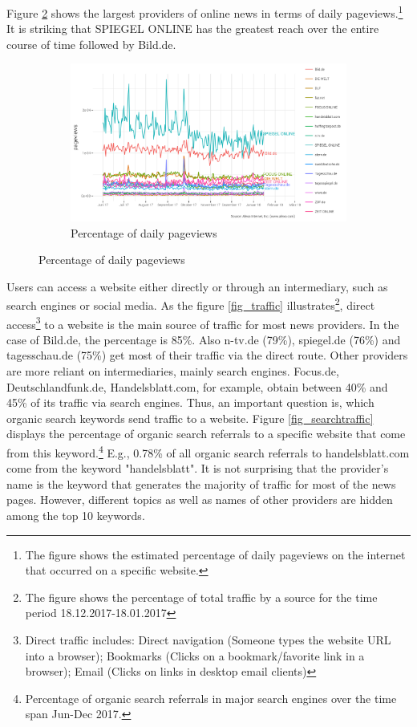 \documentclass[12pt,a4paper,notitlepage]{article}
\begin{document}
Figure \ref{fig_reach} shows the largest providers of online news in terms of daily pageviews.\footnote{The figure shows the estimated percentage of daily pageviews on the internet that occurred on a specific website.} It is striking that SPIEGEL ONLINE has the greatest reach over the entire course of time followed by Bild.de.

\begin{figure}[H]
	\caption{}
	\begin{center}
		\begin{subfigure}[normla]{0.8\textwidth}
			\includegraphics[width=\textwidth]{../figs/reach.png}
			\caption{Percentage of daily pageviews}
			\label{fig_reach}
		\end{subfigure}
	\end{center}
\end{figure}


Users can access a website either directly or through an intermediary, such as search engines or social media. As the figure \ref{fig_traffic} illustrates\footnote{The figure shows the percentage of total traffic by a source for the time period 18.12.2017-18.01.2017}, direct access\footnote{Direct traffic includes: Direct navigation (Someone types the website URL into a browser); Bookmarks (Clicks on a bookmark/favorite link in a browser); Email (Clicks on links in desktop email clients)} to a website is the main source of traffic for most news providers. In the case of Bild.de, the percentage is 85\%. Also n-tv.de (79\%), spiegel.de (76\%) and tagesschau.de (75\%) get most of their traffic via the direct route. Other providers are more reliant on intermediaries, mainly search engines. Focus.de, Deutschlandfunk.de, Handelsblatt.com, for example, obtain between 40\% and 45\% of its traffic via search engines. Thus, an important question is, which organic search keywords send traffic to a website. Figure \ref{fig_searchtraffic} displays the percentage of organic search referrals to a specific website that come from this keyword.\footnote{Percentage of organic search referrals in major search engines over the time span Jun-Dec 2017.} E.g., 0.78\% of all organic search referrals to handelsblatt.com come from the keyword "handelsblatt". It is not surprising that the provider's name is the keyword that generates the majority of traffic for most of the news pages. However, different topics as well as names of other providers are hidden among the top 10 keywords.   
\end{document}
